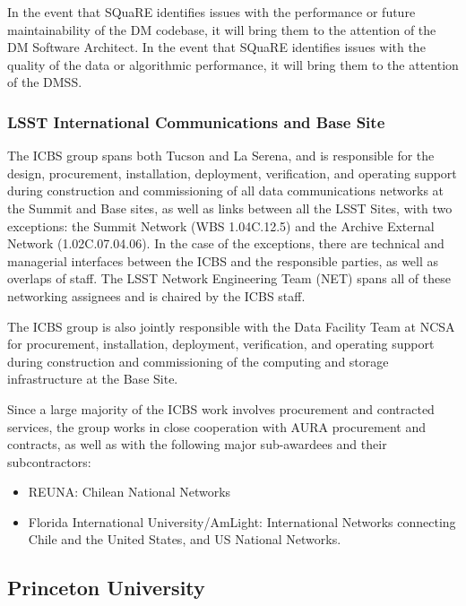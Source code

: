 In the event that \gls{SQuaRE} identifies issues with the performance or future maintainability of the \gls{DM} codebase, it will bring them to the attention of the \gls{DM} Software Architect. In the event that \gls{SQuaRE} identifies issues with the quality of the data or algorithmic performance, it will bring them to the attention of the \gls{DMSS}.

\subsubsection{LSST International Communications and Base Site}
The \gls{ICBS} group spans both Tucson and La Serena, and is responsible for the design, procurement, installation, deployment, verification, and operating support during construction and commissioning of all data communications networks at the \gls{Summit} and Base sites, as well as links between all the \gls{LSST} Sites, with two exceptions:  the \gls{Summit} Network (\gls{WBS} 1.04C.12.5) and the \gls{Archive} External Network (1.02C.07.04.06).  In the case of the exceptions, there are technical and managerial interfaces between the \gls{ICBS} and the responsible parties, as well as overlaps of staff.  The \gls{LSST} Network Engineering Team (\gls{NET}) spans all of these networking assignees and is chaired by the \gls{ICBS} staff.

The \gls{ICBS} group is also jointly responsible with the Data Facility Team at \gls{NCSA} for procurement, installation, deployment, verification, and operating support during construction and commissioning of the computing and storage infrastructure at the Base Site.

Since a large majority of the \gls{ICBS} work involves procurement and contracted services, the group works in close cooperation with \gls{AURA} procurement and contracts, as well as with the following major sub-awardees and their subcontractors:

\begin{itemize}
	\item \gls{REUNA}: Chilean National Networks
	\item Florida International University/AmLight: International Networks connecting Chile and the United States, and \gls{US} National Networks.
\end{itemize}

\subsection {Princeton University \label{sect:princeton}}

